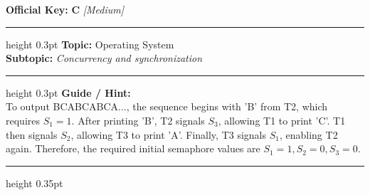 \documentclass[a4paper,10pt]{article}
\begin{document}
\begin{tcolorbox}
\tcblower

\textbf{Official Key:} \textbf{\large C} \hfill \textit{\small [Medium]}
\vspace{2pt}\hrule height 0.3pt\vspace{3pt}
\textbf{Topic:} Operating System \\
\textbf{Subtopic:} \textit{Concurrency and synchronization}
\vspace{2pt}\hrule height 0.3pt\vspace{3pt}
\textbf{Guide / Hint:} \\
{\small To output BCABCABCA..., the sequence begins with 'B' from T2, which requires $S_1 = 1$. After printing 'B', T2 signals $S_3$, allowing T1 to print 'C'. T1 then signals $S_2$, allowing T3 to print 'A'. Finally, T3 signals $S_1$, enabling T2 again. Therefore, the required initial semaphore values are $S_1 = 1, S_2 = 0, S_3 = 0$.}

\end{tcolorbox}
\vspace{6pt}\hrule height 0.35pt\vspace{6pt}
\noindent
\end{document}
